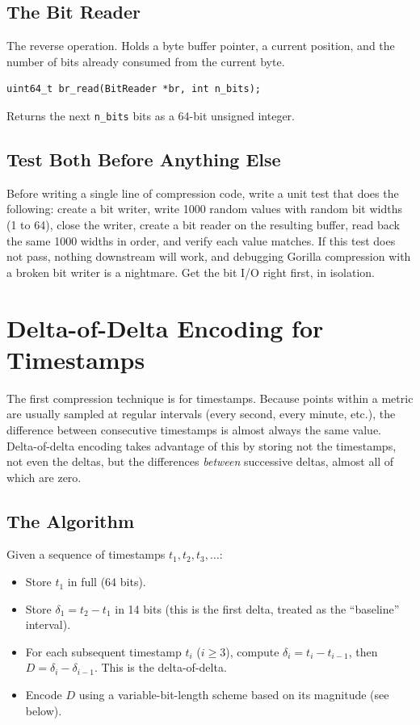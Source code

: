 \documentclass[11pt,a4paper]{article}
\begin{document}
\subsection{The Bit Reader}
The reverse operation. Holds a byte buffer pointer, a current position, and the number of bits already consumed from the current byte.

\begin{codebox}
\begin{lstlisting}
uint64_t br_read(BitReader *br, int n_bits);
\end{lstlisting}
\end{codebox}

Returns the next \texttt{n\_bits} bits as a 64-bit unsigned integer.

\subsection{Test Both Before Anything Else}
Before writing a single line of compression code, write a unit test that does the following: create a bit writer, write 1000 random values with random bit widths (1 to 64), close the writer, create a bit reader on the resulting buffer, read back the same 1000 widths in order, and verify each value matches. If this test does not pass, nothing downstream will work, and debugging Gorilla compression with a broken bit writer is a nightmare. Get the bit I/O right first, in isolation.

\section{Delta-of-Delta Encoding for Timestamps}

The first compression technique is for timestamps. Because points within a metric are usually sampled at regular intervals (every second, every minute, etc.), the difference between consecutive timestamps is almost always the same value. Delta-of-delta encoding takes advantage of this by storing not the timestamps, not even the deltas, but the differences \textit{between} successive deltas, almost all of which are zero.

\subsection{The Algorithm}
Given a sequence of timestamps $t_1, t_2, t_3, \ldots$:

\begin{itemize}
\item Store $t_1$ in full (64 bits).
\item Store $\delta_1 = t_2 - t_1$ in 14 bits (this is the first delta, treated as the ``baseline'' interval).
\item For each subsequent timestamp $t_i$ ($i \geq 3$), compute $\delta_i = t_i - t_{i-1}$, then $D = \delta_i - \delta_{i-1}$. This is the delta-of-delta.
\item Encode $D$ using a variable-bit-length scheme based on its magnitude (see below).
\end{itemize}
\end{document}

